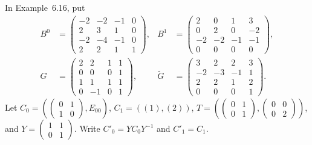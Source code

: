 \begin{definition}
    \label{def:asym_example_worked}
    \leanok
    In Example~6.16, put
    \begin{align}
        B^0          & =\begin{pmatrix}-2&-2&-1&0\\2&3&1&0\\-2&-4&-1&0\\2&2&1&1\end{pmatrix}, &
        B^1          & =\begin{pmatrix}2&0&1&3\\0&2&0&-2\\-2&-2&-1&-1\\0&0&0&0\end{pmatrix},    \\
        G            & =\begin{pmatrix}2&2&1&1\\0&0&0&1\\1&1&1&1\\0&-1&0&1\end{pmatrix},      &
        \widetilde G & =\begin{pmatrix}3&2&2&3\\-2&-3&-1&1\\2&2&1&2\\0&0&0&1\end{pmatrix}.
    \end{align}
    Let $C_0=(\left(\begin{smallmatrix}0&1\\1&0\end{smallmatrix}\right),E_{00})$,
    $C_1=((1),(2))$,
    $T=(\left(\begin{smallmatrix}0&1\\0&1\end{smallmatrix}\right),
        \left(\begin{smallmatrix}0&0\\0&2\end{smallmatrix}\right))$, and
    $Y=\left(\begin{smallmatrix}1&1\\0&1\end{smallmatrix}\right)$.
    Write $C'_0=YC_0Y^{-1}$ and $C'_1=C_1$.
\end{definition}

